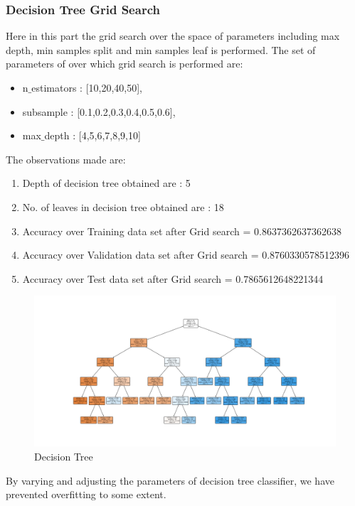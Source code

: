 \documentclass[11pt]{article}
\begin{document}
\subsubsection{Decision Tree Grid Search}
Here in this part the grid search over the space of parameters including max depth, min samples split and min samples leaf is performed. The set of parameters of over which grid search is performed are:
\begin{itemize}
\item n$\_$estimators : [10,20,40,50],  
\item subsample : [0.1,0.2,0.3,0.4,0.5,0.6], 
\item max$\_$depth : [4,5,6,7,8,9,10]
\end{itemize}
\hline
\vspace{3mm}
The observations made are:
\begin{enumerate}
\item Depth of decision tree obtained are : 5
\item No. of leaves in decision tree obtained are : 18
\item Accuracy over Training data set after Grid search = 0.8637362637362638
\item Accuracy over Validation data set after Grid search = 0.8760330578512396
\item Accuracy over Test data set after Grid search = 0.7865612648221344
\end{enumerate}
\begin{figure}[H]
  \includegraphics[width=\linewidth]{1_b_Best_decision_tree.png}
  \caption{Decision Tree}
  \label{fig1B}
\end{figure}
By varying and adjusting the parameters of decision tree classifier, we have prevented overfitting to some extent.
\end{document}
